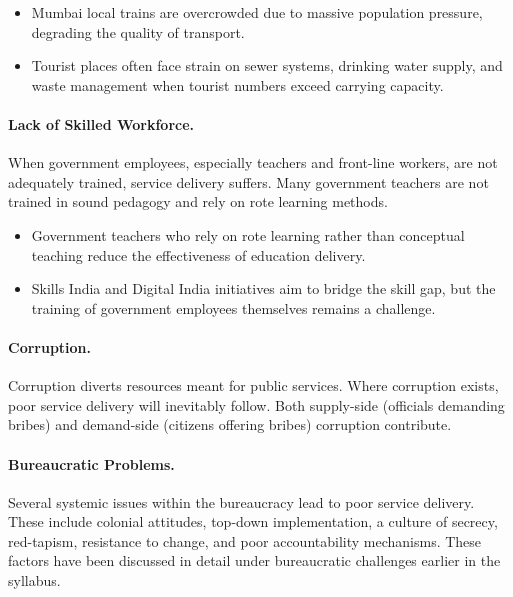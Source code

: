\begin{ExampleBox}
\begin{itemize}
\item Mumbai local trains are overcrowded due to massive population pressure, degrading the quality of transport.
\item Tourist places often face strain on sewer systems, drinking water supply, and waste management when tourist numbers exceed carrying capacity.
\end{itemize}
\end{ExampleBox}

\paragraph{Lack of Skilled Workforce.} When government employees, especially teachers and front-line workers, are not adequately trained, service delivery suffers. Many government teachers are not trained in sound pedagogy and rely on rote learning methods.

\begin{ExampleBox}
\begin{itemize}
\item Government teachers who rely on rote learning rather than conceptual teaching reduce the effectiveness of education delivery.
\item Skills India and Digital India initiatives aim to bridge the skill gap, but the training of government employees themselves remains a challenge.
\end{itemize}
\end{ExampleBox}

\paragraph{Corruption.} Corruption diverts resources meant for public services. Where corruption exists, poor service delivery will inevitably follow. Both supply-side (officials demanding bribes) and demand-side (citizens offering bribes) corruption contribute.

\paragraph{Bureaucratic Problems.} Several systemic issues within the bureaucracy lead to poor service delivery. These include colonial attitudes, top-down implementation, a culture of secrecy, red-tapism, resistance to change, and poor accountability mechanisms. These factors have been discussed in detail under bureaucratic challenges earlier in the syllabus.

